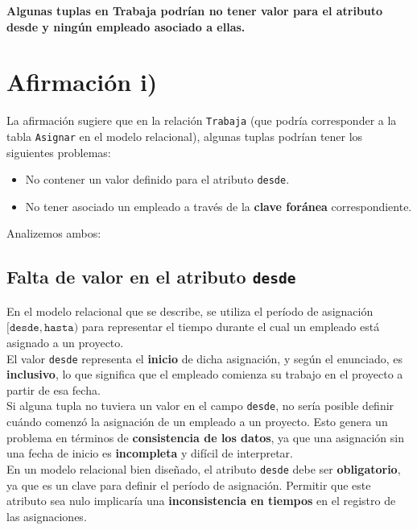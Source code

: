 \textbf{Algunas tuplas en Trabaja podrían no tener valor para el atributo desde y ningún empleado asociado a ellas.}\vspace{.3cm}

\section{Afirmación i)}

La afirmación sugiere que en la relación \texttt{Trabaja} (que podría corresponder a la tabla \texttt{Asignar} en el modelo relacional), algunas tuplas podrían tener los siguientes problemas:
\begin{itemize}
    \item No contener un valor definido para el atributo \texttt{desde}.
    \item No tener asociado un empleado a través de la \textbf{clave foránea} correspondiente.
\end{itemize}

Analizemos ambos:


\subsection{Falta de valor en el atributo \texttt{desde}}

En el modelo relacional que se describe, se utiliza el período de asignación $[\texttt{desde}, \texttt{hasta})$ para representar el tiempo durante el cual un empleado está asignado a un proyecto. \\

El valor \texttt{desde} representa el \textbf{inicio} de dicha asignación, y según el enunciado, es \textbf{inclusivo}, lo que significa que el empleado comienza su trabajo en el proyecto a partir de esa fecha. \\

Si alguna tupla no tuviera un valor en el campo \texttt{desde}, no sería posible definir cuándo comenzó la asignación de un empleado a un proyecto. Esto genera un problema en términos de \textbf{consistencia de los datos}, ya que una asignación sin una fecha de inicio es \textbf{incompleta} y difícil de interpretar. \\

En un modelo relacional bien diseñado, el atributo \texttt{desde} debe ser \textbf{obligatorio}, ya que es un clave para definir el período de asignación. Permitir que este atributo sea nulo implicaría una \textbf{inconsistencia en tiempos} en el registro de las asignaciones.


